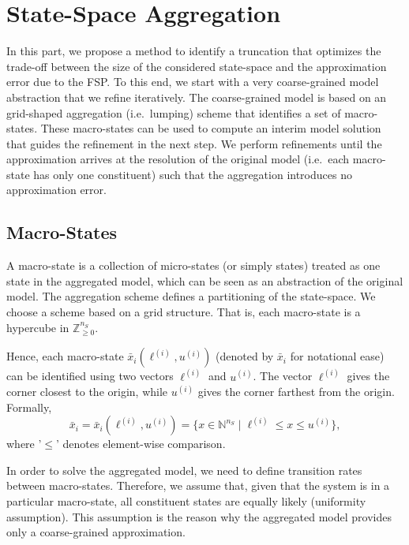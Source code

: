 \chapter{State-Space Aggregation}\label{ch:lumping}
In this part, we propose a  method to identify a truncation that optimizes the trade-off between the size of the considered state-space and the approximation error due to the \acf{FSP}\@.
To this end, we start with a very coarse-grained model abstraction that we refine iteratively. 
The coarse-grained model is based on an grid-shaped aggregation (i.e.\ lumping) scheme that identifies a set of macro-states.
These macro-states can be used to compute an interim model solution that guides the refinement in the next step.
We perform refinements until the approximation arrives at the resolution of the original model (i.e.\ each macro-state has only one constituent) such that the aggregation introduces no approximation error.

\section{Macro-States}
A macro-state is a collection of micro-states (or simply states) treated as one state in the aggregated model, which can be seen as an abstraction of the original model.
The aggregation scheme defines a partitioning of the state-space.
We choose a scheme based on a grid structure. That is, each macro-state is a hypercube in $\mathbb{Z}_{\geq 0}^{n_S}$.

Hence, each macro-state $\bar{x}_i(\ell^{(i)},u^{(i)})$ (denoted by $\bar{x}_i$ for notational ease) can be identified using two vectors $\ell^{(i)}$
and $u^{(i)}$.
The vector $\ell^{(i)}$ gives the corner closest to the origin, while $u^{(i)}$
gives the corner farthest from the origin.
Formally,
\begin{equation}\label{eq:macro_state}
    \bar{x}_i = \bar{x}_i(\ell^{(i)},u^{(i)}) =  \{x\in\mathbb{N}^{n_S} \mid  \ell^{(i)}  \leq x  \leq u^{(i)} \},
\end{equation}
where '$\leq$' denotes element-wise comparison.

In order to solve the aggregated model, we need to define transition rates between macro-states.
Therefore, we assume that, given that the system is in a particular macro-state, all constituent states are equally likely (uniformity assumption).
This assumption is the reason why the aggregated model provides only a coarse-grained approximation. 


